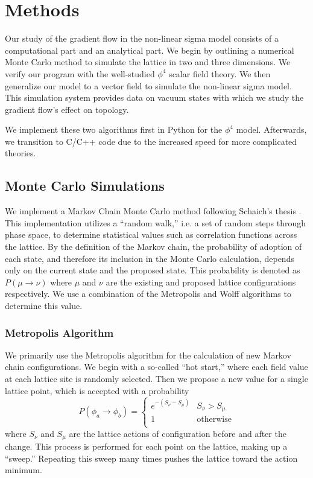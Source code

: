 \documentclass[12pt]{report}
\begin{document}
\chapter{Methods}
\label{sec:methods}
Our study of the gradient flow in the non-linear sigma model consists of a computational part and an analytical part. We begin by outlining a numerical Monte Carlo method to simulate the lattice in two and three dimensions. We verify our program with the well-studied $\phi^4$ scalar field theory. We then generalize our model to a vector field to simulate the non-linear sigma model. This simulation system provides data on vacuum states with which we study the gradient flow's effect on topology.

We implement these two algorithms first in Python for the $\phi^4$ model. Afterwards, we transition to C/C++ code due to the increased speed for more complicated theories. 

\section{Monte Carlo Simulations}
\label{sec:mc}

We implement a Markov Chain Monte Carlo method following Schaich's thesis \cite{schaich2006}. This implementation utilizes a ``random walk,'' i.e. a set of random steps through phase space, to determine statistical values such as correlation functions across the lattice. By the definition of the Markov chain, the probability of adoption of each state, and therefore its inclusion in the Monte Carlo calculation, depends only on the current state and the proposed state. This probability is denoted as $P(\mu\rightarrow\nu)$ where $\mu$ and $\nu$ are the existing and proposed lattice configurations respectively. We use a combination of the Metropolis and Wolff algorithms to determine this value.

\subsection{Metropolis Algorithm}
We primarily use the Metropolis algorithm for the calculation of new Markov chain configurations. We begin with a so-called ``hot start,'' where each field value at each lattice site is randomly selected. Then we propose a new value for a single lattice point, which is accepted with a probability
\begin{equation}
    P(\phi_a\rightarrow\phi_b) = \begin{cases} 
        e^{-(S_\nu - S_\mu)} & S_\nu > S_\mu \\
        1 & \mathrm{otherwise} \\
   \end{cases}
\end{equation}
where $S_\nu$ and $S_\mu$ are the lattice actions of configuration before and after the change. This process is performed for each point on the lattice, making up a ``sweep.'' Repeating this sweep many times pushes the lattice toward the action minimum.
\end{document}
